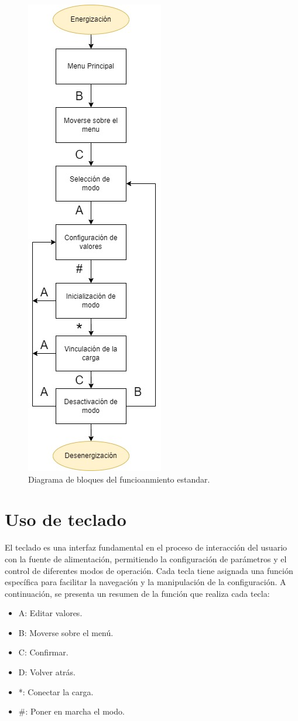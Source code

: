\begin{figure}[H]
    \centering
    \includegraphics[scale=0.7]{./imagenes/funcionamiento_normal.jpg}
    \caption{Diagrama de bloques del funcioanmiento estandar.}
    \label{F:funcionamiento_normal}
\end{figure}

\section{Uso de teclado} 
El teclado es una interfaz fundamental en el proceso de interacción del usuario con la fuente de alimentación, permitiendo la configuración de parámetros y el control de diferentes modos de operación. Cada tecla tiene asignada una función específica para facilitar la navegación y la manipulación de la configuración. A continuación, se presenta un resumen de la función que realiza cada tecla:
\begin{itemize}
    \item A: Editar valores.
    \item B: Moverse sobre el menú.
    \item C: Confirmar.
    \item D: Volver atrás.
    \item *: Conectar la carga.
    \item \#: Poner en marcha el modo.
\end{itemize}

